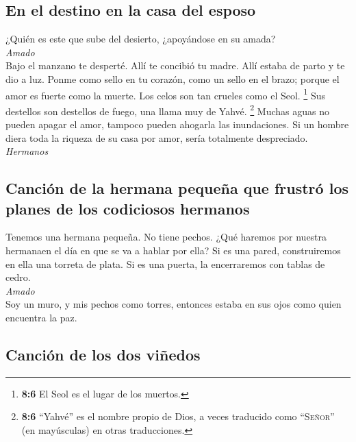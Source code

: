 \hypertarget{en-el-destino-en-la-casa-del-esposo}{%
\subsection{En el destino en la casa del
esposo}\label{en-el-destino-en-la-casa-del-esposo}}

 ¿Quién es este que sube del desierto, ¿apoyándose en su
amada?\\
\emph{Amado}\\
Bajo el manzano te desperté. Allí te concibió tu madre. Allí estaba de
parto y te dio a luz.  Ponme como sello en tu corazón,
como un sello en el brazo; porque el amor es fuerte como la muerte. Los
celos son tan crueles como el Seol. \footnote{\textbf{8:6} El Seol es el
  lugar de los muertos.} Sus destellos son destellos de fuego, una llama
muy de Yahvé. \footnote{\textbf{8:6} ``Yahvé'' es el nombre propio de
  Dios, a veces traducido como ``\textsc{Señor}'' (en mayúsculas) en
  otras traducciones.}  Muchas aguas no pueden apagar el
amor, tampoco pueden ahogarla las inundaciones. Si un hombre diera toda
la riqueza de su casa por amor, sería totalmente despreciado.\\
\emph{Hermanos}\\

\hypertarget{canciuxf3n-de-la-hermana-pequeuxf1a-que-frustruxf3-los-planes-de-los-codiciosos-hermanos}{%
\subsection{Canción de la hermana pequeña que frustró los planes de los
codiciosos
hermanos}\label{canciuxf3n-de-la-hermana-pequeuxf1a-que-frustruxf3-los-planes-de-los-codiciosos-hermanos}}

 Tenemos una hermana pequeña. No tiene pechos. ¿Qué
haremos por nuestra hermanaen el día en que se va a hablar por ella?
 Si es una pared, construiremos en ella una torreta de
plata. Si es una puerta, la encerraremos con tablas de cedro.\\
\emph{Amado}\\
 Soy un muro, y mis pechos como torres, entonces estaba
en sus ojos como quien encuentra la paz.

\hypertarget{canciuxf3n-de-los-dos-viuxf1edos}{%
\subsection{Canción de los dos
viñedos}\label{canciuxf3n-de-los-dos-viuxf1edos}}

